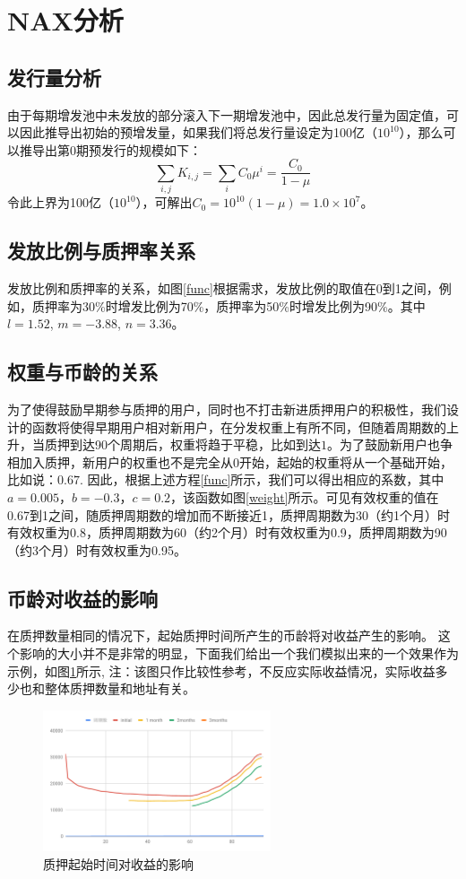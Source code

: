 \section{NAX分析}
\subsection{发行量分析}
由于每期增发池中未发放的部分滚入下一期增发池中，因此总发行量为固定值，可以因此推导出初始的预增发量，如果我们将总发行量设定为100亿（\(10^{10}\)），那么可以推导出第0期预发行的规模如下：
\begin{equation}
  \sum_{i,j} K_{i,j} = \sum_i C_0 \mu^i = \frac{C_0}{1-\mu}
\end{equation}
  令此上界为100亿（\(10^{10}\)），可解出\(C_0 = 10^{10}(1-\mu) = 1.0\times10^7\)。

\subsection{发放比例与质押率关系}
发放比例和质押率的关系，如图\ref{func}根据需求，发放比例的取值在0到1之间，例如，质押率为30\%时增发比例为70\%，质押率为50\%时增发比例为90\%。其中\(l=1.52\), \(m=-3.88\), \(n=3.36\)。

\subsection{权重与币龄的关系}
为了使得鼓励早期参与质押的用户，同时也不打击新进质押用户的积极性，我们设计的函数将使得早期用户相对新用户，在分发权重上有所不同，但随着周期数的上升，当质押到达90个周期后，权重将趋于平稳，比如到达$1$。为了鼓励新用户也争相加入质押，新用户的权重也不是完全从0开始，起始的权重将从一个基础开始，比如说：$0.67$. 因此，根据上述方程\ref{func}所示，我们可以得出相应的系数，其中\(a=0.005\)，\(b=-0.3\)，\(c=0.2\)，该函数如图\ref{weight}所示。可见有效权重的值在0.67到1之间，随质押周期数的增加而不断接近1，质押周期数为30（约1个月）时有效权重为0.8，质押周期数为60（约2个月）时有效权重为0.9，质押周期数为90（约3个月）时有效权重为0.95。

\subsection{币龄对收益的影响}
在质押数量相同的情况下，起始质押时间所产生的币龄将对收益产生的影响。 这个影响的大小并不是非常的明显，下面我们给出一个我们模拟出来的一个效果作为示例，如图\ref{fig:compare}所示, 注：该图只作比较性参考，不反应实际收益情况，实际收益多少也和整体质押数量和地址有关。
\begin{figure}[htbp]
  \centering
    \includegraphics[width=0.6\textwidth]{../common/compare.pdf}
    \caption{质押起始时间对收益的影响 \label{fig:compare}}
\end{figure}

